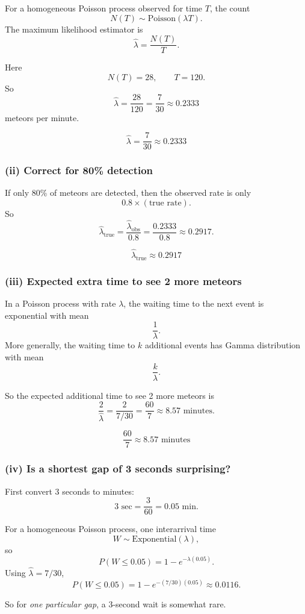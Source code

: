 \documentclass[11pt]{article}
\begin{document}
For a homogeneous Poisson process observed for time $T$, the count
\[
N(T)\sim \text{Poisson}(\lambda T).
\]
The maximum likelihood estimator is
\[
\hat\lambda=\frac{N(T)}{T}.
\]

Here
\[
N(T)=28,\qquad T=120.
\]
So
\[
\hat\lambda=\frac{28}{120}=\frac{7}{30}\approx 0.2333
\]
meteors per minute.

\[
\boxed{\hat\lambda=\frac{7}{30}\approx 0.2333}
\]

\subsubsection*{(ii) Correct for 80\% detection}

If only 80\% of meteors are detected, then the observed rate is only
\[
0.8\times(\text{true rate}).
\]
So
\[
\hat\lambda_{\text{true}}=\frac{\hat\lambda_{\text{obs}}}{0.8}
=
\frac{0.2333}{0.8}
\approx 0.2917.
\]

\[
\boxed{\hat\lambda_{\text{true}}\approx 0.2917}
\]

\subsubsection*{(iii) Expected extra time to see 2 more meteors}

In a Poisson process with rate $\lambda$, the waiting time to the next event is exponential with mean
\[
\frac{1}{\lambda}.
\]
More generally, the waiting time to $k$ additional events has Gamma distribution with mean
\[
\frac{k}{\lambda}.
\]

So the expected additional time to see 2 more meteors is
\[
\frac{2}{\hat\lambda}
=
\frac{2}{7/30}
=
\frac{60}{7}
\approx 8.57 \text{ minutes}.
\]

\[
\boxed{\frac{60}{7}\approx 8.57\text{ minutes}}
\]

\subsubsection*{(iv) Is a shortest gap of 3 seconds surprising?}

First convert 3 seconds to minutes:
\[
3\text{ sec} = \frac{3}{60}=0.05 \text{ min}.
\]

For a homogeneous Poisson process, one interarrival time
\[
W\sim \text{Exponential}(\lambda),
\]
so
\[
P(W\le 0.05)=1-e^{-\lambda(0.05)}.
\]
Using $\hat\lambda=7/30$,
\[
P(W\le 0.05)=1-e^{-(7/30)(0.05)}
\approx 0.0116.
\]

So for \emph{one particular gap}, a 3-second wait is somewhat rare.
\end{document}
